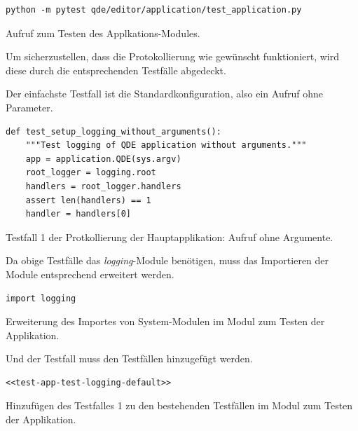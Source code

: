 \documentclass[10pt, openright, notitlepage]{scrreprt}
\begin{document}
\begin{listing}[H]
\begin{verbatim}
python -m pytest qde/editor/application/test_application.py
\end{verbatim}
\caption{Aufruf zum Testen des Applkations-Modules.}
\end{listing}

Um sicherzustellen, dass die Protokollierung wie gewünscht funktioniert, wird
diese durch die entsprechenden Testfälle abgedeckt.

Der einfachste Testfall ist die Standardkonfiguration, also ein Aufruf ohne
Parameter.

\begin{listing}[H]
\begin{verbatim}
def test_setup_logging_without_arguments():
    """Test logging of QDE application without arguments."""
    app = application.QDE(sys.argv)
    root_logger = logging.root
    handlers = root_logger.handlers
    assert len(handlers) == 1
    handler = handlers[0]
\end{verbatim}
\caption{\label{test-app-test-logging-default}
Testfall 1 der Protkollierung der Hauptapplikation: Aufruf ohne Argumente.}
\end{listing}

Da obige Testfälle das \emph{logging}-Module benötigen, muss das Importieren der Module
entsprechend erweitert werden.

\begin{listing}[H]
\begin{verbatim}
import logging
\end{verbatim}
\caption{\label{test-app-system-imports}
Erweiterung des Importes von System-Modulen im Modul zum Testen der Applikation.}
\end{listing}

Und der Testfall muss den Testfällen hinzugefügt werden.

\begin{listing}[H]
\begin{verbatim}
<<test-app-test-logging-default>>
\end{verbatim}
\caption{\label{test-app-test-cases}
Hinzufügen des Testfalles 1 zu den bestehenden Testfällen im Modul zum Testen der Applikation.}
\end{listing}
\end{document}
